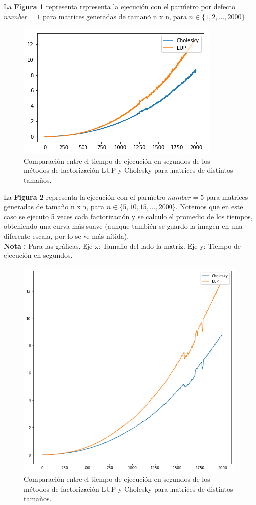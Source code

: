 \documentclass[12pt,letterpaper]{article}
\begin{document}
La \textbf{Figura 1} representa representa la ejecuci\'on con el par\'metro por defecto $number=1$ para matrices generadas de taman\~o n x n, para $n \in \{1,2,...,2000\}$. \\
    \begin{figure}[!h]
    \centering
    \includegraphics[width=0.8\linewidth]{execution_times_graph_N=2000.png}
    \caption{Comparaci\'on entre el tiempo de ejecuci\'on en segundos de los m\'etodos de factorización LUP y Cholesky para matrices de distintos tama\~nos.}
    \end{figure}

La  \textbf{Figura 2} representa la ejecuci\'on con el par\'metro $number=5$ para matrices generadas de tama\~no n x n, para $n \in \{5,10,15,...,2000\}$. Notemos que en este caso se ejecuto 5 veces cada factorizaci\'on y se calculo el promedio de los tiempos, obteniendo una curva m\'as suave (aunque tambi\'en se guardo la imagen en una diferente escala, por lo se ve m\'as n\'itida). \\

\textbf{Nota :} Para las gr\'aficas. Eje x: Tama\~no del lado la matriz. Eje y: Tiempo de ejecuci\'on en segundos.
    \begin{figure}[!h]
    \centering
    \includegraphics[width=0.8\linewidth,height=0.5\linewidth]{execution_times_graph_N=2000_smooth.png}
    \caption{Comparaci\'on entre el tiempo de ejecuci\'on en segundos de los m\'etodos de factorización LUP y Cholesky para matrices de distintos tama\~nos.}
    \end{figure}
\end{document}
